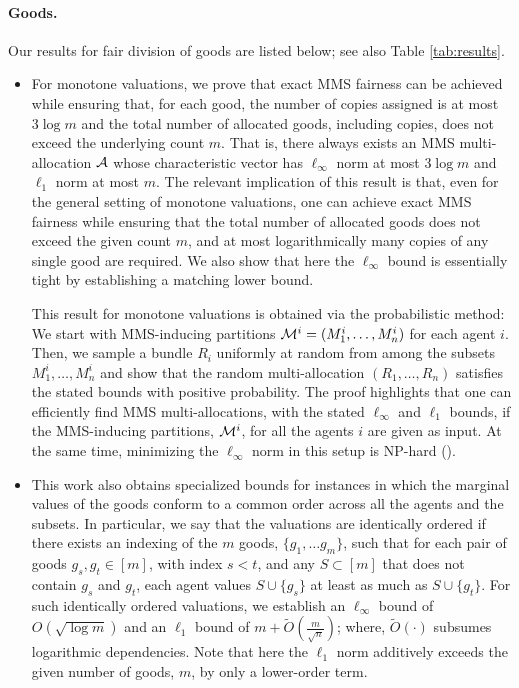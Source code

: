 \paragraph{Goods.} Our results for fair division of goods are listed below; see also Table \ref{tab:results}. 
\begin{itemize}
\item For monotone valuations, we prove that exact MMS fairness can be achieved while ensuring that, for each good, the number of copies assigned is at most $3 \log m$ and the total number of allocated goods, including copies, does not exceed the underlying count $m$. That is, there always exists an MMS multi-allocation $\mathcal{A}$ whose characteristic vector has $\ell_{\infty}$ norm at most $3 \log m$ and $\ell_1$ norm at most $m$. The relevant implication of this result is that, even for the general setting of monotone valuations, one can achieve exact MMS fairness while ensuring that the total number of allocated goods does not exceed the given count $m$, and at most logarithmically many copies of any single good are required. We also show that here the $\ell_{\infty}$ bound is essentially tight by establishing a matching lower bound. 

This result for monotone valuations is obtained via the probabilistic method: We start with MMS-inducing partitions $\mathcal{M}^i = (M^i_1, \ldots, M^i_n)$ for each agent $i$. Then, we sample a bundle $R_i$ uniformly at random from among the subsets $M^i_1, \ldots, M^i_n$ and show that the random multi-allocation $ (R_1, \ldots, R_n)$ satisfies the stated bounds with positive probability. The proof highlights that one can efficiently find MMS multi-allocations, with the stated $\ell_\infty$ and $\ell_1$ bounds, if the MMS-inducing partitions, $\mathcal{M}^i$, for all the agents $i$ are given as input. At the same time, minimizing the $\ell_\infty$ norm in this setup is {\rm NP}-hard ().  

\item This work also obtains specialized bounds for instances in which the marginal values of the goods conform to a common order across all the agents and the subsets. In particular, we say that the valuations are identically ordered if there exists an indexing of the $m$ goods, $\{g_1, \ldots g_m\}$, such that for each pair of goods $g_s, g_t \in [m]$, with index $s < t$, and any $S \subset [m]$ that does not contain $g_s$ and $g_t$, each  agent values $S \cup \{g_s \}$ at least as much as $S \cup \{g_t \}$. For such identically ordered valuations, we establish an $\ell_{\infty}$ bound of $O(\sqrt{\log m})$ and an $\ell_1$ bound of $m +  \widetilde{O}\left(\frac{m}{\sqrt{n}} \right)$; where, $\widetilde{O}(\cdot)$ subsumes logarithmic dependencies. Note that here the $\ell_1$ norm additively exceeds the given number of goods, $m$, by only a lower-order term.   
 


\end{itemize}
